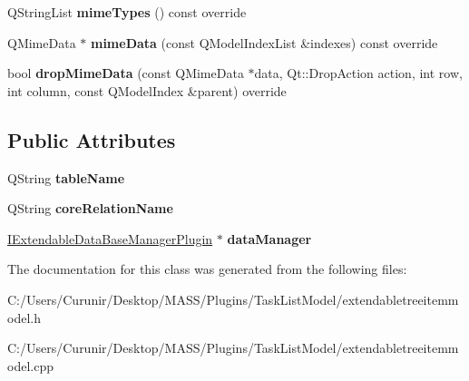 \begin{DoxyCompactItemize}
\mbox{\label{class_extendable_tree_item_model_ab3fd3745761bab08ed049cf84386241d}} 
Q\+String\+List {\bfseries mime\+Types} () const override
\item 
\mbox{\label{class_extendable_tree_item_model_a417f3c9c45819e586b97d3784c016e79}} 
Q\+Mime\+Data $\ast$ {\bfseries mime\+Data} (const Q\+Model\+Index\+List \&indexes) const override
\item 
\mbox{\label{class_extendable_tree_item_model_a0ba7b75a8cd3406e52237f85e97017b2}} 
bool {\bfseries drop\+Mime\+Data} (const Q\+Mime\+Data $\ast$data, Qt\+::\+Drop\+Action action, int row, int column, const Q\+Model\+Index \&parent) override
\end{DoxyCompactItemize}
\subsection*{Public Attributes}
\begin{DoxyCompactItemize}
\item 
\mbox{\label{class_extendable_tree_item_model_a66679a4354b3e64b53b73fbe54ce0dfc}} 
Q\+String {\bfseries table\+Name}
\item 
\mbox{\label{class_extendable_tree_item_model_a641619506ce41dd28183b461ea8c5fda}} 
Q\+String {\bfseries core\+Relation\+Name}
\item 
\mbox{\label{class_extendable_tree_item_model_a4811726ebb543469630ff4b5eb4d6c35}} 
\hyperlink{class_i_extendable_data_base_manager_plugin}{I\+Extendable\+Data\+Base\+Manager\+Plugin} $\ast$ {\bfseries data\+Manager}
\end{DoxyCompactItemize}


The documentation for this class was generated from the following files\+:\begin{DoxyCompactItemize}
\item 
C\+:/\+Users/\+Curunir/\+Desktop/\+M\+A\+S\+S/\+Plugins/\+Task\+List\+Model/extendabletreeitemmodel.\+h\item 
C\+:/\+Users/\+Curunir/\+Desktop/\+M\+A\+S\+S/\+Plugins/\+Task\+List\+Model/extendabletreeitemmodel.\+cpp\end{DoxyCompactItemize}
